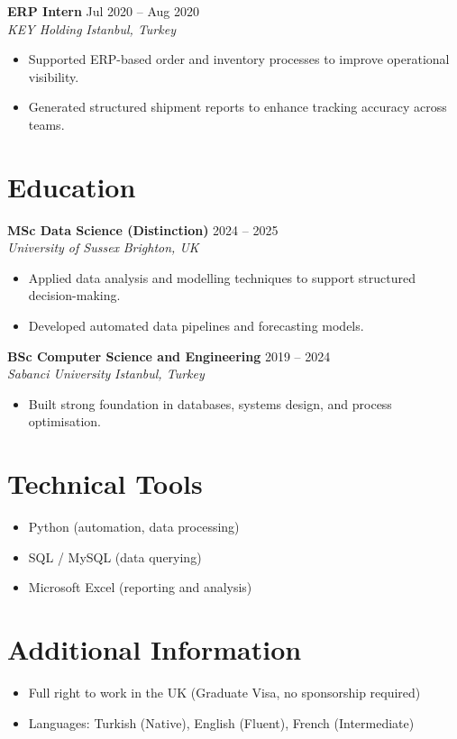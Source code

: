 \documentclass[11pt, a4paper]{article}
\newcommand{\entry}[4]{
  \noindent\textbf{#1} \hfill {\footnotesize #2} \\
  \textit{#3} \hfill \textit{#4}
  \vspace{4pt}
}
\begin{document}
\vspace{6pt}

\entry{ERP Intern}{Jul 2020 -- Aug 2020}
{KEY Holding}{Istanbul, Turkey}

\begin{itemize}[noitemsep, topsep=0pt, leftmargin=1.5em]
    \item Supported ERP-based order and inventory processes to improve operational visibility.
    \item Generated structured shipment reports to enhance tracking accuracy across teams.
\end{itemize}

\section{Education}

\entry{MSc Data Science (Distinction)}{2024 -- 2025}
{University of Sussex}{Brighton, UK}

\begin{itemize}[noitemsep, topsep=0pt, leftmargin=1.5em]
    \item Applied data analysis and modelling techniques to support structured decision-making.
    \item Developed automated data pipelines and forecasting models.
\end{itemize}

\vspace{6pt}

\entry{BSc Computer Science and Engineering}{2019 -- 2024}
{Sabanci University}{Istanbul, Turkey}

\begin{itemize}[noitemsep, topsep=0pt, leftmargin=1.5em]
    \item Built strong foundation in databases, systems design, and process optimisation.
\end{itemize}

\section{Technical Tools}

\begin{itemize}[noitemsep, topsep=0pt, leftmargin=1.5em]
    \item Python (automation, data processing)
    \item SQL / MySQL (data querying)
    \item Microsoft Excel (reporting and analysis)
\end{itemize}

\section{Additional Information}

\begin{itemize}[noitemsep, topsep=0pt, leftmargin=1.5em]
    \item Full right to work in the UK (Graduate Visa, no sponsorship required)
    \item Languages: Turkish (Native), English (Fluent), French (Intermediate)
\end{itemize}
\end{document}
